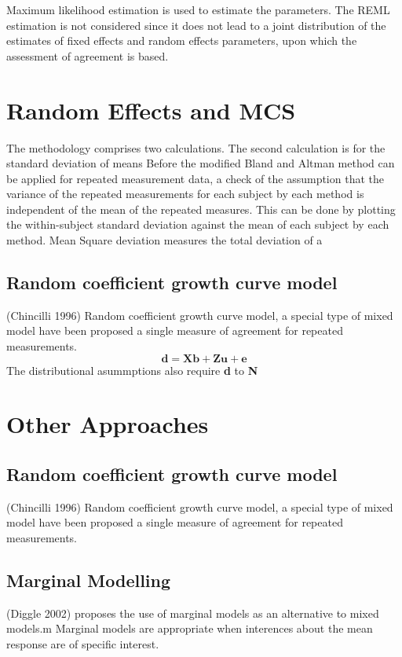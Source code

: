 \documentclass[12pt, a4paper]{report}
\theoremstyle{plain}
\theoremstyle{definition}
\theoremstyle{remark}
\begin{document}
Maximum likelihood estimation is used to estimate the parameters.
The REML estimation is not considered since it does not lead to a
joint distribution of the estimates of fixed effects and random
effects parameters, upon which the assessment of agreement is
based.

\section{Random Effects and MCS}
The methodology comprises two calculations. The second calculation
is for the standard deviation of means Before the modified Bland
and Altman method can be applied for repeated measurement data, a
check of the assumption that the variance of the repeated
measurements for each subject by each method is independent of the
mean of the repeated measures. This can be done by plotting the
within-subject standard deviation against the mean of each subject
by each method. Mean Square deviation measures the total deviation
of a


\subsection{Random coefficient growth curve model} (Chincilli
1996) Random coefficient growth curve model, a special type of
mixed model have been proposed a single measure of agreement for
repeated measurements.
\begin{equation}
\textbf{d}= \textbf{Xb} + \textbf{Zu} + \textbf{e}
\end{equation}
The distributional asummptions also require \textbf{d} to
\textbf{N}

\newpage
\section{Other Approaches}

\subsection{Random coefficient growth curve model} (Chincilli
1996) Random coefficient growth curve model, a special type of
mixed model have been proposed  a single measure of agreement for
repeated measurements.
\subsection{Marginal Modelling}
(Diggle 2002) proposes the use of marginal models as an
alternative to mixed models.m Marginal models are appropriate when
interences about the mean response are of specific interest.






\end{document}
